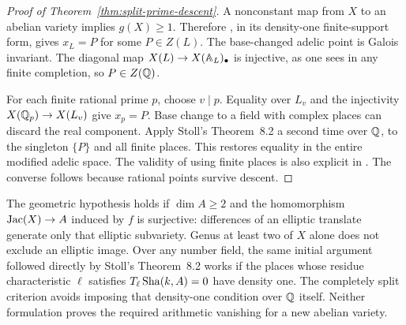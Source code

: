 \begin{proof}[Proof of Theorem~\ref{thm:split-prime-descent}]
A nonconstant map from $X$ to an abelian variety implies
$g(X)\ge1$. Therefore
\citet[Theorem~8.2, pp.~383--384]{Stoll2007}, in its
density-one finite-support form, gives $x_L=P$ for some
$P\in Z(L)$. The base-changed adelic point is Galois invariant.
The diagonal map $X(L)\to X(\mathbb A_L)_\bullet$ is injective, as
one sees in any finite completion, so $P\in Z(\mathbb Q)$.

For each finite rational prime $p$, choose $v\mid p$.
Equality over $L_v$ and the injectivity
$X(\mathbb Q_p)\to X(L_v)$ give $x_p=P$. Base change to a field
with complex places can discard the real component. Apply
Stoll's Theorem~8.2 a second time over $\mathbb Q$, to the singleton
$\{P\}$ and all finite places. This restores equality in the
entire modified adelic space. The validity of using finite
places is also explicit in \citet[\S3]{StollErrata2017}.
The converse follows because rational points survive descent.
\end{proof}

\begin{remark}
\label{rem:split-prime-scope}
The geometric hypothesis holds if $\dim A\ge2$ and the
homomorphism $\operatorname{Jac}(X)\to A$ induced by $f$ is surjective:
differences of an elliptic translate generate only that
elliptic subvariety. Genus at least two of $X$ alone does not
exclude an elliptic image. Over any number field, the same
initial argument followed directly by Stoll's Theorem~8.2
works if the places whose residue characteristic $\ell$
satisfies $T_\ell\operatorname{Sha}(k,A)=0$ have density one. The completely
split criterion avoids imposing that density-one condition
over $\mathbb Q$ itself. Neither formulation proves the required
arithmetic vanishing for a new abelian variety.
\end{remark}
